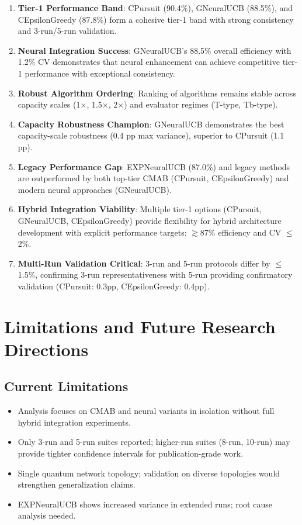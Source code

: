 \documentclass[12pt,a4paper]{article}
\newcommand{\legacy}[1]{\textcolor{legacycolor}{\textbf{#1}}}
\newcommand{\neural}[1]{\textcolor{neuralcolor}{\textbf{#1}}}
\begin{document}
\begin{enumerate}
\item \textbf{Tier-1 Performance Band}: CPursuit (90.4\%), GNeuralUCB (88.5\%), and CEpsilonGreedy (87.8\%) form a cohesive tier-1 band with strong consistency and 3-run/5-run validation.
\item \neural{Neural Integration Success}: GNeuralUCB's 88.5\% overall efficiency with 1.2\% CV demonstrates that neural enhancement can achieve competitive tier-1 performance with exceptional consistency.
\item \textbf{Robust Algorithm Ordering}: Ranking of algorithms remains stable across capacity scales (1$\times$, 1.5$\times$, 2$\times$) and evaluator regimes (T-type, Tb-type).
\item \neural{Capacity Robustness Champion}: GNeuralUCB demonstrates the best capacity-scale robustness (0.4 pp max variance), superior to CPursuit (1.1 pp).
\item \legacy{Legacy Performance Gap}: EXPNeuralUCB (87.0\%) and legacy methods are outperformed by both top-tier CMAB (CPursuit, CEpsilonGreedy) and modern neural approaches (GNeuralUCB).
\item \textbf{Hybrid Integration Viability}: Multiple tier-1 options (CPursuit, GNeuralUCB, CEpsilonGreedy) provide flexibility for hybrid architecture development with explicit performance targets: $\gtrsim$87\% efficiency and CV $\leq$2\%.
\item \textbf{Multi-Run Validation Critical}: 3-run and 5-run protocols differ by $\leq$1.5\%, confirming 3-run representativeness with 5-run providing confirmatory validation (CPursuit: 0.3pp, CEpsilonGreedy: 0.4pp).
\end{enumerate}

\section{Limitations and Future Research Directions}

\subsection{Current Limitations}

\begin{itemize}
\item Analysis focuses on CMAB and neural variants in isolation without full hybrid integration experiments.
\item Only 3-run and 5-run suites reported; higher-run suites (8-run, 10-run) may provide tighter confidence intervals for publication-grade work.
\item Single quantum network topology; validation on diverse topologies would strengthen generalization claims.
\item EXPNeuralUCB shows increased variance in extended runs; root cause analysis needed.
\end{itemize}
\end{document}
